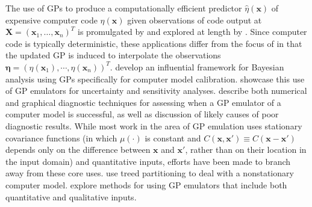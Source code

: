 \documentclass{article}
\begin{document}
The use of GPs to produce a computationally efficient predictor $\hat \eta (\mathbf x)$ of expensive computer code $\eta(\mathbf x)$ given observations of code output at $\mathbf X=(\mathbf x_1,\ldots,\mathbf x_n)^T$ is promulgated by \cite{Sacks1989} and explored at length by \cite{Santner2003a}.
%
Since computer code is typically deterministic, these applications differ from the focus of \cite{OHagan1978} in that the updated GP is induced to interpolate the observations $\boldsymbol \eta = (\eta(\mathbf x_1),\cdots,\eta(\mathbf x_n))^T$. 
%
\cite{Kennedy2001} develop an influential framework for Bayesian analysis using GPs specifically for computer model calibration. 
%
\cite{Kennedy2006} showcase this use of GP emulators for uncertainty and sensitivity analyses. 
%
\cite{Bastos2009} describe both numerical and graphical diagnostic techniques for assessing when a GP emulator of a computer model is successful, as well as discussion of likely causes of poor diagnostic results. 
%
While most work in the area of GP emulation uses stationary covariance functions (in which $\mu(\cdot)$ is constant and $C(\mathbf x,\mathbf x' )\equiv C(\mathbf x-\mathbf x' )$ depends only on the difference between $\mathbf x$ and $\mathbf x'$, rather than on their location in the input domain) and quantitative inputs, efforts have been made to branch away from these core uses. 
%
\cite{Gramacy2008} use treed partitioning to deal with a nonstationary computer model. 
%
\cite{Qian2008} explore methods for using GP emulators that include both quantitative and qualitative inputs.
\end{document}

